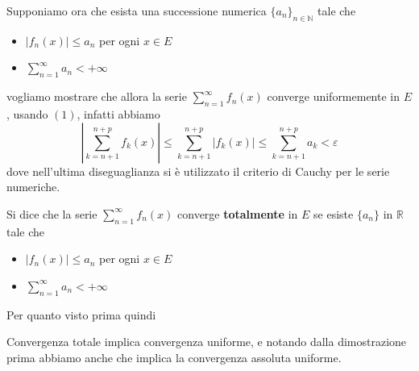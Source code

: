 \begin{example}
Supponiamo ora che esista una successione numerica \({\{a_{n}\}}_{n \in
\mathbb{N}}  \) tale che
\begin{itemize}
    \item \(|f_{n}(x)| \le a_{n}\) per ogni \(x \in E\) 
    \item \(\sum_{n=1}^{\infty} a_{n} < +\infty\)
\end{itemize}
vogliamo mostrare che allora la serie \(\sum_{n=1}^{\infty} f_{n}(x)\) converge
uniformemente in \(E\), usando \((1)\), infatti abbiamo 
\[
    \left| \sum_{k=n+1}^{n+p} f_{k}(x) \right| \le \sum_{k=n+1}^{n+p} |f_{k}(x)|
    \le \sum_{k=n+1}^{n+p} a_{k} < \varepsilon
\]
dove nell'ultima diseguaglianza si è utilizzato il criterio di Cauchy per le
serie numeriche.
\end{example}
\begin{definition}
    Si dice che la serie \(\sum_{n=1}^{\infty} f_{n}(x)\) converge
    \textbf{totalmente} in \(E\) se esiste \(\{a_{n}\} \) in \(\mathbb{R}\) tale
    che 
    \begin{itemize}
        \item \(|f_{n}(x)| \le a_{n}\) per ogni \(x \in E\) 
        \item \(\sum_{n=1}^{\infty} a_{n} < +\infty\)
    \end{itemize}
\end{definition}
Per quanto visto prima quindi
\begin{proposition}
    Convergenza totale implica convergenza uniforme, e notando dalla
    dimostrazione prima abbiamo anche che implica la convergenza assoluta
    uniforme.
\end{proposition}

